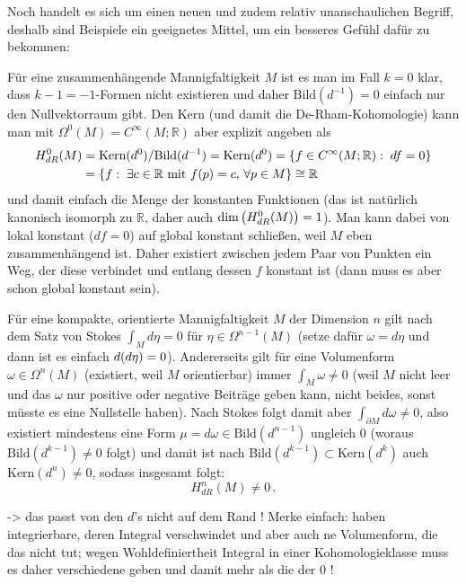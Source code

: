 \documentclass[../H_Analysis_main.tex]{subfiles}
\begin{document}
Noch handelt es sich um einen neuen und zudem relativ unanschaulichen Begriff, deshalb sind Beispiele ein geeignetes Mittel, um ein besseres Gefühl dafür zu bekommen:
\begin{bsp}
Für eine zusammenhängende Mannigfaltigkeit $M$ ist es man im Fall $k = 0$ klar, dass $k - 1 = - 1$-Formen nicht existieren und daher $\text{Bild}(d^{- 1}) = \qty{0}$ einfach nur den Nullvektorraum gibt. Den Kern (und damit die De-Rham-Kohomologie) kann man mit $\Omega^0(M) = C^\infty(M; \mathbb{R})$ aber explizit angeben als
\begin{equation}
\begin{split}
H_{dR}^0(M) &= \text{Kern}(d^0)/ \text{Bild}(d^{-1}) = \text{Kern}(d^0) = \qty{f \in C^\infty(M; \mathbb{R}): \; df = 0}
\\
&= \qty{f: \; \exists c \in \mathbb{R} \text{ mit } f(p) = c, \, \forall p \in M} \cong \mathbb{R}
\end{split}
\end{equation}
und damit einfach die Menge der konstanten Funktionen (das ist natürlich kanonisch isomorph zu $\mathbb{R}$, daher auch $\dim\qty(H_{dR}^0(M)) = 1$). Man kann dabei von lokal konstant ($df = 0$) auf global konstant schließen, weil $M$ eben zusammenhängend ist. Daher existiert zwischen jedem Paar von Punkten ein Weg, der diese verbindet und entlang dessen $f$ konstant ist (dann muss es aber schon global konstant sein).

\end{bsp}

\begin{bsp}
Für eine kompakte, orientierte Mannigfaltigkeit $M$ der Dimension $n$ gilt nach dem Satz von Stokes $\int_M d\eta = 0$ für $\eta \in \Omega^{n - 1}(M)$ (setze dafür $\omega = d\eta$ und dann ist es einfach $d\qty(d\eta) = 0$). Andererseits gilt für eine Volumenform $\omega \in \Omega^n(M)$ (existiert, weil $M$ orientierbar) immer $\int_M \omega \neq 0$ (weil $M$ nicht leer und das $\omega$ nur positive oder negative Beiträge geben kann, nicht beides, sonst müsste es eine Nullstelle haben). Nach Stokes folgt damit aber $\int_{\partial M} d\omega \neq 0$, also existiert mindestens eine Form $\mu = d\omega \in \text{Bild}(d^{n - 1})$ ungleich 0 (woraus $\text{Bild}(d^{k - 1}) \neq \qty{0}$ folgt) und damit ist nach $\text{Bild}(d^{k - 1}) \subset \text{Kern}(d^k)$ auch $\text{Kern}(d^n) \neq \qty{0}$, sodass insgesamt folgt:
\begin{equation}
H_{dR}^n(M) \neq \qty{0} \, .
\end{equation}

-> das passt von den $d$'s nicht auf dem Rand ! Merke einfach: haben integrierbare, deren Integral verschwindet und aber auch ne Volumenform, die das nicht tut; wegen Wohldefiniertheit Integral in einer Kohomologieklasse muss es daher verschiedene geben und damit mehr als die der 0 !
\end{bsp}
\end{document}
